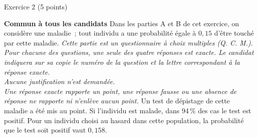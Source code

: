 
%
\begin{h2}Exercice 2 (5 points)\end{h2}
\textbf{Commun  à tous les candidats}
\bigbreak
Dans les parties A et B de cet exercice, on considère une maladie~; tout individu a une probabilité égale à $0,15$ d'être touché par cette maladie.
\bigbreak
{}
\medbreak
\emph{Cette partie est un questionnaire à choix multiples (Q. C. M.). Pour chacune des questions, une seule des quatre réponses est exacte. Le candidat indiquera sur sa copie le numéro de la question et la lettre correspondant à la réponse exacte. \\Aucune justification n'est demandée. \\Une réponse exacte rapporte un point, une réponse fausse ou une absence de réponse ne rapporte ni n'enlève aucun point.}
\medbreak
Un test de dépistage de cette maladie a été mis au point. Si l'individu est malade, dans 94\,\% des cas le test est positif. Pour un individu choisi au hasard dans cette population, la probabilité que le test soit positif vaut $0,158$.
\medbreak
